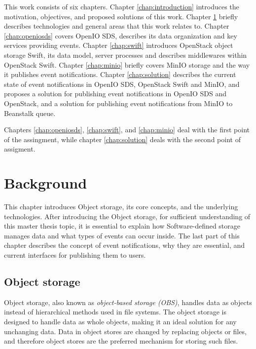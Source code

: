 This work consists of six chapters. Chapter \ref{chap:introduction} introduces the motivation, objectives, and proposed solutions of this work. Chapter \ref{chap:background} briefly describes technologies and general areas that this work relates to. Chapter \ref{chap:openiosds} covers OpenIO SDS, describes its data organization and key services providing events. Chapter \ref{chap:swift} introduces OpenStack object storage Swift, its data model, server processes and describes middlewares within OpenStack Swift. Chapter \ref{chap:minio} briefly covers MinIO storage and the way it publishes event notifications. Chapter \ref{chap:solution} describes the current state of event notifications in OpenIO SDS, OpenStack Swift and MinIO, and proposes a solution for publishing event notifications in OpenIO SDS and OpenStack, and a solution for publishing event notifications from MinIO to Beanstalk queue.

Chapters \ref{chap:openiosds}, \ref{chap:swift}, and \ref{chap:minio} deal with the first point of the assingment, while chapter \ref{chap:solution} deals with the second point of assigment.



\chapter{Background}\label{chap:background}

    This chapter introduces Object storage, its core concepts, and the underlying technologies. After introducing the Object storage, for sufficient understanding of this master thesis topic, it is essential to explain how Software-defined storage manages data and what types of events can occur inside. The last part of this chapter describes the concept of event notifications, why they are essential, and current interfaces for publishing them to users.

\section{Object storage}
    Object storage, also known as \textit{object-based storage (OBS)}, handles data as objects instead of hierarchical methods used in file systems\cite{objectBasedStorage}. The object storage is designed to handle data as whole objects, making it an ideal solution for any unchanging data. Data in object stores are changed by replacing objects or files, and therefore object stores are the preferred mechanism for storing such files\cite{networkStorage}.

